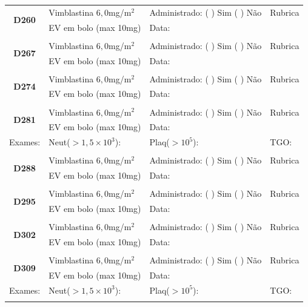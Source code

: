 \documentclass[11pt,a4paper,oldfontcommands]{memoir}
\begin{document}
\begin{center}
\begin{table}[H]
\begin{tabular}{p{}p{}|p{}|p{3cm}}
    \hline
    \\
    \hline
    \multicolumn{1}{c|}{\multirow{2}{*}{\textbf{D260}}}&{Vimblastina \(6,0\)mg/m\(^2\)}&{Administrado: (  ) Sim (  ) Não}&{Rubrica}\\
    \multicolumn{1}{c|}{}&{EV em bolo (max 10mg)}&{Data:}&\\
    \hline
    \\
    \hline
    \multicolumn{1}{c|}{\multirow{2}{*}{\textbf{D267}}}&{Vimblastina \(6,0\)mg/m\(^2\)}&{Administrado: (  ) Sim (  ) Não}&{Rubrica}\\
    \multicolumn{1}{c|}{}&{EV em bolo (max 10mg)}&{Data:}&\\
    \hline
    \\
    \hline
    \multicolumn{1}{c|}{\multirow{2}{*}{\textbf{D274}}}&{Vimblastina \(6,0\)mg/m\(^2\)}&{Administrado: (  ) Sim (  ) Não}&{Rubrica}\\
    \multicolumn{1}{c|}{}&{EV em bolo (max 10mg)}&{Data:}&\\
    \hline
    \\
    \hline
    \multicolumn{1}{c|}{\multirow{2}{*}{\textbf{D281}}}&{Vimblastina \(6,0\)mg/m\(^2\)}&{Administrado: (  ) Sim (  ) Não}&{Rubrica}\\
    \multicolumn{1}{c|}{}&{EV em bolo (max 10mg)}&{Data:}&\\
    \hline
    {Exames:}&{Neut(\(>1,5\times10^3\)):}&{Plaq(\(>10^5\)):}&{TGO:}
    \\
    \hline
    \\
        \hline
    \multicolumn{1}{c|}{\multirow{2}{*}{\textbf{D288}}}&{Vimblastina \(6,0\)mg/m\(^2\)}&{Administrado: (  ) Sim (  ) Não}&{Rubrica}\\
    \multicolumn{1}{c|}{}&{EV em bolo (max 10mg)}&{Data:}&\\
    \hline
    \\
    \hline
    \multicolumn{1}{c|}{\multirow{2}{*}{\textbf{D295}}}&{Vimblastina \(6,0\)mg/m\(^2\)}&{Administrado: (  ) Sim (  ) Não}&{Rubrica}\\
    \multicolumn{1}{c|}{}&{EV em bolo (max 10mg)}&{Data:}&\\
    \hline
    \\
    \hline
    \multicolumn{1}{c|}{\multirow{2}{*}{\textbf{D302}}}&{Vimblastina \(6,0\)mg/m\(^2\)}&{Administrado: (  ) Sim (  ) Não}&{Rubrica}\\
    \multicolumn{1}{c|}{}&{EV em bolo (max 10mg)}&{Data:}&\\
    \hline
    \\
    \hline
    \multicolumn{1}{c|}{\multirow{2}{*}{\textbf{D309}}}&{Vimblastina \(6,0\)mg/m\(^2\)}&{Administrado: (  ) Sim (  ) Não}&{Rubrica}\\
    \multicolumn{1}{c|}{}&{EV em bolo (max 10mg)}&{Data:}&\\
    \hline
    {Exames:}&{Neut(\(>1,5\times10^3\)):}&{Plaq(\(>10^5\)):}&{TGO:}
    \\
    \hline
    \\
\end{tabular}
\end{table}


\end{center}
\end{document}
